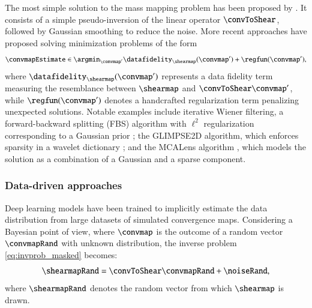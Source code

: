\documentclass{aa}
\begin{document}
The most simple solution to the mass mapping problem has been proposed by \citet{Kaiser1993}. It consists of a simple pseudo-inversion of the linear operator $\convToShear$, followed by Gaussian smoothing to reduce the noise.
More recent approaches have proposed solving minimization problems of the form
\begin{equation}
    \convmapEstimate \in \argmin_{\convmap'} \datafidelity_{\shearmap}(\convmap') + \regfun(\convmap'),
\label{eq:minprob}
\end{equation}
where $\datafidelity_{\shearmap}(\convmap')$ represents a data fidelity term measuring the resemblance between $\shearmap$ and $\convToShear\convmap'$, while $\regfun(\convmap')$ denotes a handcrafted regularization term penalizing unexpected solutions. Notable examples include iterative Wiener filtering, a forward-backward splitting (FBS) algorithm with $\ell^2$ regularization corresponding to a Gaussian prior \citep{Bobin2012}; the GLIMPSE2D algorithm, which enforces sparsity in a wavelet dictionary \citep{Lanusse2016}; and the MCALens algorithm \citep{Starck2021}, which models the solution as a combination of a Gaussian and a sparse component.

\subsubsection{Data-driven approaches}
\label{subsubsec:background_relatedwork_dl}

Deep learning models have been trained to implicitly estimate the data distribution from large datasets of simulated convergence maps. Considering a Bayesian point of view, where $\convmap$ is the outcome of a random vector $\convmapRand$ with unknown distribution, the inverse problem \eqref{eq:invprob_masked} becomes:
\begin{equation}
    \shearmapRand = \convToShear \convmapRand + \noiseRand,
\label{eq:invprob_randbayes}
\end{equation}
where $\shearmapRand$ denotes the random vector from which $\shearmap$ is drawn.
\end{document}
